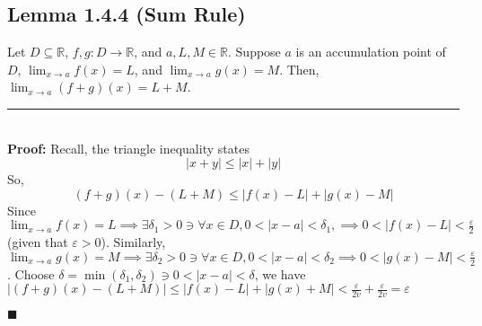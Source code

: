 \documentclass[11pt]{book}
\newcommand{\R}{\mathbb{R}}
\newcommand{\horline}{\noindent\rule{14.25cm}{0.6pt}\\}
\newcommand{\QED}{\begin{flushright}$\blacksquare$\end{flushright}}
\begin{document}
	\subsection{Lemma 1.4.4 (Sum Rule)}
		\begin{lemm}
			Let $D \subseteq \R$, $f,g:D \to \R$, and $a,L, M \in \R$. Suppose $a$ is an accumulation point of $D$,
			$\displaystyle\lim_{x \to a}{f(x) = L}$, and $\displaystyle\lim_{x \to a}{g(x) = M}$. Then,
			$\displaystyle\lim_{x \to a}{(f + g)(x) = L + M}$.\\
			\horline
			\textbf{Proof:} Recall, the triangle inequality states $$|x + y| \leq |x| + |y|$$
			So, $$(f+g)(x) - (L+M) \leq |f(x) - L| + |g(x) - M|$$
			Since $\displaystyle\lim_{x \to a}{f(x) = L} \implies \exists \delta_1 > 0 \ni \forall x \in D, 0 < |x -a| <\delta_1,
			\implies 0 < |f(x) - L| < \frac{\varepsilon}{2}$ (given that $\varepsilon > 0$). Similarly, $\displaystyle\lim_{x \to a}{g(x) = M}
			\implies \exists \delta_2 > 0 \ni \forall x \in D, 0 < | x - a| < \delta_2 \implies 0 < | g(x) - M| < \frac{\varepsilon}{2}$. Choose
			$\delta = \min(\delta_1,\delta_2) \ni 0 < |x - a| < \delta$, we have $|(f+g)(x) - (L+M)| \leq |f(x) - L| + |g(x) + M| < \frac{\varepsilon}{2v} +
			\frac{\varepsilon}{2v} = \varepsilon$ \QED

		\end{lemm}
		\newpage
\end{document}
